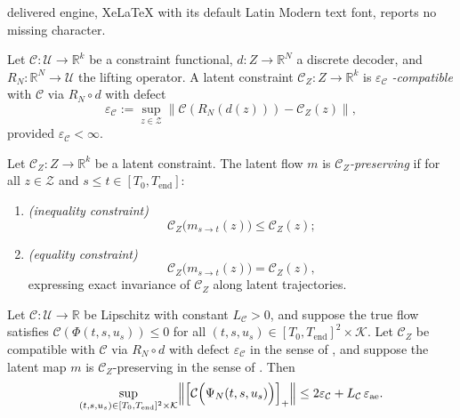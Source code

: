 \documentclass[10pt,a4paper]{amsart}
\begin{document}
delivered engine, XeLaTeX with its default Latin Modern text font, reports no missing character.
\begin{definition}
\label{def:compatible}
Let $\mathcal{C} : \mathcal{U} \to \mathbb{R}^k$ be a constraint functional, $d : Z \to \mathbb{R}^N$ a discrete decoder, and $R_N : \mathbb{R}^N \to \mathcal{U}$ the lifting operator. A latent constraint
$\mathcal{C}_Z : Z \to \mathbb{R}^k$ is $\varepsilon_{\mathcal{C}}$ \emph{-compatible} with $\mathcal{C}$ via $R_N \circ d$ with defect
\[
\varepsilon_{\mathcal{C}}
:=
\sup_{z \in \mathcal{Z}}
\|\mathcal{C}(R_N(d(z))) - \mathcal{C}_Z(z)\|,
\]
provided $\varepsilon_{\mathcal{C}} < \infty$.
\end{definition}

\begin{definition}
\label{def:structure-preserving}
Let $\mathcal{C}_Z : Z \to \mathbb{R}^k$ be a latent constraint. The latent flow $m$ is \emph{$\mathcal{C}_Z$-preserving} if for all $z \in \mathcal{Z}$ and $s \leq t \in [T_0,T_{\mathrm{end}}]$:
\begin{enumerate}
    \item[(i)] \emph{(inequality constraint)}
    \[
    \mathcal{C}_Z\bigl(m_{s\to t}(z)\bigr) \leq \mathcal{C}_Z(z);
    \]
    \item[(ii)] \emph{(equality constraint)}
    \[
    \mathcal{C}_Z\bigl(m_{s\to t}(z)\bigr) = \mathcal{C}_Z(z),
    \]
    expressing exact invariance of $\mathcal{C}_Z$ along latent trajectories.
\end{enumerate}

\end{definition}

\begin{theorem}
\label{thm:apriori}
Let $\mathcal{C} : \mathcal{U} \to \mathbb{R}$ be Lipschitz with constant $L_{\mathcal{C}} > 0$, and suppose the true flow satisfies $\mathcal{C}(\Phi(t,s,u_s)) \leq 0$ for all $(t,s, u_s) \in [T_0,T_{\mathrm{end}}]^2 \times \mathcal K$. Let  $\mathcal{C}_Z$ be compatible with $\mathcal{C}$ via $R_N \circ d$ with defect $\varepsilon_{\mathcal{C}}$ in the sense of , and suppose the latent map $m$ is $\mathcal{C}_Z$-preserving  in the sense of . Then
\[
\sup_{(t,s,u_s)\in[T_0,T_{\mathrm{end}}]^2\times \mathcal K} \Bigl\|\Bigl[ \mathcal{C}\Bigl( \Psi_{N} (t,s,u_s) \Bigr) \Bigr]_+\Bigr\| \le 2\varepsilon_{\mathcal{C}} + L_{\mathcal{C}}\,\varepsilon_{\mathrm{ae}}.
\]
\end{theorem}
\end{document}
